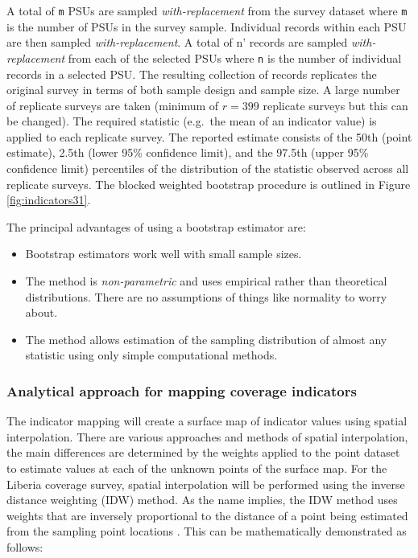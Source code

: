 \documentclass[12pt,a4paper]{article}
\begin{document}
A total of \texttt{m} PSUs are sampled \emph{with-replacement} from the survey dataset where \texttt{m} is the number of PSUs in the survey sample. Individual records within each PSU are then sampled \emph{with-replacement}. A total of n' records are sampled \emph{with-replacement} from each of the selected PSUs where \texttt{n} is the number of individual records in a selected PSU. The resulting collection of records replicates the original survey in terms of both sample design and sample size. A large number of replicate surveys are taken (minimum of \(r = 399\) replicate surveys but this can be changed). The required statistic (e.g.~the mean of an indicator value) is applied to each replicate survey. The reported estimate consists of the 50th (point estimate), 2.5th (lower 95\% confidence limit), and the 97.5th (upper 95\% confidence limit) percentiles of the distribution of the statistic observed across all replicate surveys. The blocked weighted bootstrap procedure is outlined in Figure \ref{fig:indicators31}.

The principal advantages of using a bootstrap estimator are:

\begin{itemize}
\item
  Bootstrap estimators work well with small sample sizes.
\item
  The method is \emph{non-parametric} and uses empirical rather than theoretical distributions. There are no assumptions of things like normality to worry about.
\item
  The method allows estimation of the sampling distribution of almost any statistic using only simple computational methods.
\end{itemize}

\hypertarget{analytical-approach-for-mapping-coverage-indicators}{%
\subsubsection{Analytical approach for mapping coverage indicators}\label{analytical-approach-for-mapping-coverage-indicators}}

The indicator mapping will create a surface map of indicator values using spatial interpolation. There are various approaches and methods of spatial interpolation, the main differences are determined by the weights applied to the point dataset to estimate values at each of the unknown points of the surface map. For the Liberia coverage survey, spatial interpolation will be performed using the inverse distance weighting (IDW) method. As the name implies, the IDW method uses weights that are inversely proportional to the distance of a point being estimated from the sampling point locations \citep{Isaaks:1989uk, diggle2007mbg, diggle2013statistical}. This can be mathematically demonstrated as follows:
\end{document}
